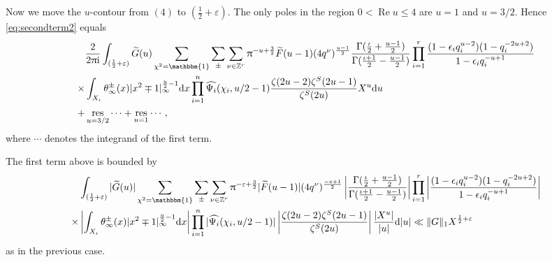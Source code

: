 \documentclass[10pt,oneside,reqno]{amsart}
\makeatletter
\newcommand\rmd{\mathrm{d}}
\newcommand\rmi{\mathrm{i}}
\newcommand\ZZ{\mathbb{Z}}
\newcommand\triv{\mathbbm{1}}
\newcommand\dpii{2\uppi\rmi}
\renewcommand\Re{\mathop{\mathrm{Re}}}
\DeclareMathOperator\res{res}
\renewcommand\leq{\leqslant}
\theoremstyle{THEOREM}
\theoremstyle{DEFINITION}
\theoremstyle{EXERCISE}
\numberwithin{equation}{section}
\renewenvironment{proof}[1][\proofname]{\par
  \vspace{-6pt}
  \pushQED{\qed}
  \normalfont \topsep6\p@\@plus6\p@\relax
  \trivlist
  \item[\hskip\labelsep\rmfamily\bfseries
    #1\@addpunct{:}]\ignorespaces
}{
  \popQED\endtrivlist\@endpefalse
  \vspace{-6pt}
}
\makeatother
\begin{document}
\begin{proof}
Now we move the $u$-contour from $(4)$ to $(\frac12+\varepsilon)$. The only poles in the region $0<\Re u\leq 4$ are $u=1$ and $u=3/2$. Hence \eqref{eq:secondterm2} equals
\begin{align*}
&\frac{2}{\dpii}\int_{(\frac12+\varepsilon)}\widetilde{G}(u)\sum_{\chi^2=\triv}\sum_{\pm}\sum_{\nu\in \ZZ^r}\uppi^{  -u+\frac32}\widetilde{F}(u-1)(4q^\nu)^{\frac{u-1}{2}} \frac{\Gamma(\frac{\iota}{2}+\frac{u-1}{2})}{\Gamma(\frac{\iota+1}{2}-\frac{u-1}{2})} \prod_{i=1}^{r}\frac{(1-\epsilon_i q_i^{u-2})(1-q_i^{-2u+2})}{1-\epsilon_iq_i^{-u+1}}\\
\times&\int_{X_\iota}\theta_\infty^\pm(x)|x^2\mp 1|_\infty^{\frac u2-1}\rmd x\prod_{i=1}^{n}\widehat{\Psi_i}(\chi_i,u/2-1)\frac{\zeta(2u-2)\zeta^S(2u-1)}
{\zeta^S(2u)}X^u\rmd u\\
+&\res_{u=3/2}\cdots
+\res_{u=1}\cdots,
\end{align*}
where $\cdots$ denotes the integrand of the first term.

The first term above is bounded by
\begin{align*}
&\int_{(\frac12+\varepsilon)}|\widetilde{G}(u)|\sum_{\chi^2=\triv}\sum_{\pm}\sum_{\nu\in \ZZ^r}\uppi^{-\varepsilon+\frac32}|\widetilde{F}(u-1)|(4q^\nu)^{\frac{-\varepsilon+1}{2}} \left|\frac{\Gamma(\frac{\iota}{2}+\frac{u-1}{2})}{\Gamma(\frac{\iota+1}{2}-\frac{u-1}{2})}\right| \prod_{i=1}^{r}\left|\frac{(1-\epsilon_i q_i^{u-2})(1-q_i^{-2u+2})}{1-\epsilon_iq_i^{-u+1}}\right|\\
\times&\left|\int_{X_\iota}\theta_\infty^\pm(x)|x^2\mp 1|_\infty^{\frac u2-1}\rmd x\right| \prod_{i=1}^{n}|\widehat{\Psi_i}(\chi_i,u/2-1)|\left|\frac{\zeta(2u-2)\zeta^S(2u-1)}
{\zeta^S(2u)}\right|\frac{|X^u|}{|u|}\rmd |u|\ll \|G\|_1X^{\frac12+\varepsilon}
\end{align*}
as in the previous case.


\end{proof}
\end{document}
